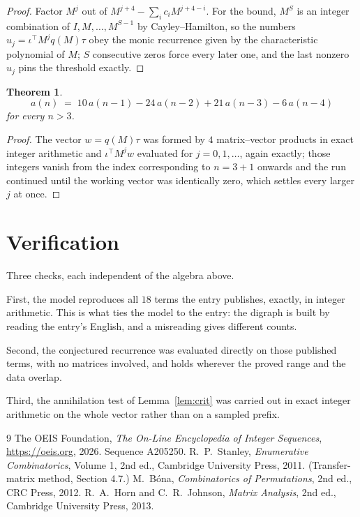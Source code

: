 \documentclass[11pt,a4paper]{article}
\theoremstyle{plain}
\newtheorem{theorem}{Theorem}
\theoremstyle{definition}
\begin{document}
\begin{proof}
Factor $M^{j}$ out of $M^{j+4}-\sum_ic_iM^{j+4-i}$. For the bound, $M^{S}$
is an integer combination of $I,M,\dots,M^{S-1}$ by Cayley--Hamilton, so the numbers
$u_j=\iota^{\!\top}M^{j}q(M)\tau$ obey the monic recurrence given by the characteristic
polynomial of $M$; $S$ consecutive zeros force every later one, and the last nonzero $u_j$
pins the threshold exactly.
\end{proof}

\begin{theorem}
\[
a(n)\;=\;10\,a(n-1) - 24\,a(n-2) + 21\,a(n-3) - 6\,a(n-4)
\]
for every $n>3$.
\end{theorem}

\begin{proof}
The vector $w=q(M)\tau$ was formed by $4$ matrix--vector products in exact integer
arithmetic and $\iota^{\!\top}M^{j}w$ evaluated for $j=0,1,\dots$, again exactly; those
integers vanish from the index corresponding to $n=3+1$ onwards and the run continued
until the working vector was identically zero, which settles every larger $j$ at once.
\end{proof}

\section{Verification}

Three checks, each independent of the algebra above.

First, the model reproduces all $18$ terms the entry publishes, exactly, in integer
arithmetic. This is what ties the model to the entry: the digraph is built by reading the
entry's English, and a misreading gives different counts.

Second, the conjectured recurrence was evaluated directly on those published terms, with no
matrices involved, and holds wherever the proved range and the data overlap.

Third, the annihilation test of Lemma~\ref{lem:crit} was carried out in exact integer
arithmetic on the whole vector rather than on a sampled prefix.

\begin{thebibliography}{9}
 The OEIS Foundation, \emph{The On-Line Encyclopedia of Integer
Sequences}, \url{https://oeis.org}, 2026. Sequence A205250.
 R.~P.~Stanley, \emph{Enumerative Combinatorics}, Volume 1, 2nd ed.,
Cambridge University Press, 2011. (Transfer-matrix method, Section 4.7.)
 M.~B\'ona, \emph{Combinatorics of Permutations}, 2nd ed., CRC
Press, 2012.
 R.~A.~Horn and C.~R.~Johnson, \emph{Matrix Analysis}, 2nd ed., Cambridge
University Press, 2013.
\end{thebibliography}
\end{document}
